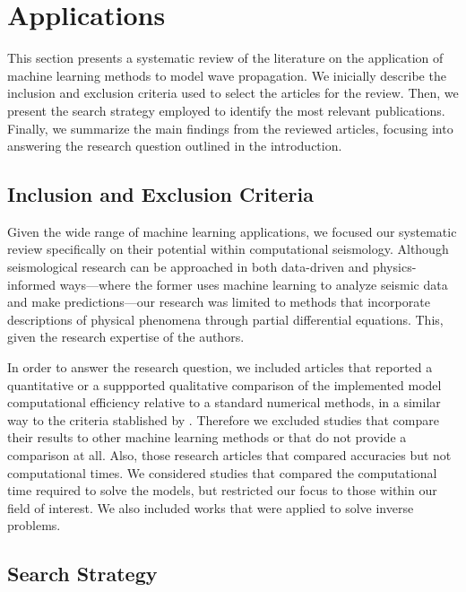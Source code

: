 \documentclass[11pt,twoside]{article}
\begin{document}
\section{Applications}\label{sec:applications}

This section presents a systematic review of the literature on the application of machine learning methods to model 
wave propagation. We inicially describe the inclusion and exclusion criteria used to select the articles for the review. 
Then, we present the search strategy employed to identify the most relevant publications. Finally, we summarize the
main findings from the reviewed articles, focusing into answering the research question outlined in the introduction.

\subsection*{Inclusion and Exclusion Criteria}

Given the wide range of machine learning applications, we focused our systematic review specifically on their potential 
within computational seismology. Although seismological research can be approached in both data-driven and physics-informed 
ways—where the former uses machine learning to analyze seismic data and make predictions—our research was limited to 
methods that incorporate descriptions of physical phenomena through partial differential equations. This, given the
research expertise of the authors.  

In order to answer the research question, we included articles that reported a quantitative or a suppported qualitative 
comparison of the implemented model computational efficiency relative to a standard numerical methods, in a similar way 
to the criteria stablished by . Therefore we excluded studies that compare 
their results to other machine learning methods or that do not provide a comparison at all. Also, those research
articles that compared accuracies but not computational times. We considered studies that compared the computational time 
required to solve the models, but restricted our focus to those within our field of interest. We also included works that 
were applied to solve inverse problems. 

\subsection*{Search Strategy}
\end{document}
